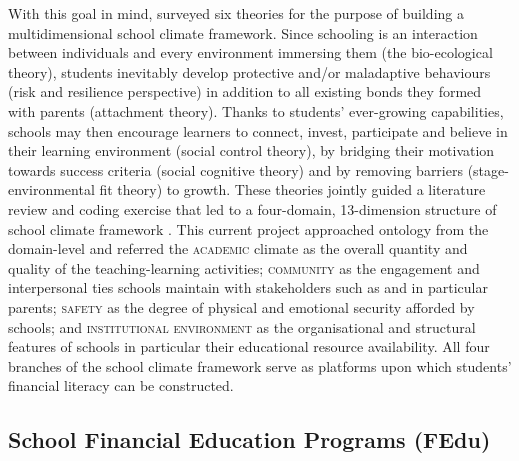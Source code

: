 \documentclass[a4paper,11pt,UKenglish,twoside,openright]{report}\usepackage[]{graphicx}\usepackage[]{color}
\begin{document}
With this goal in mind, \textcite{wang:2016} surveyed six theories for the purpose of building a multidimensional school climate framework. Since schooling is an interaction between individuals and every environment immersing them (the bio-ecological theory), students inevitably develop protective and/or maladaptive behaviours (risk and resilience perspective) in addition to all existing bonds they formed with parents (attachment theory). Thanks to students' ever-growing capabilities, schools may then encourage learners to connect, invest, participate and believe in their learning environment (social control theory), by bridging their motivation towards success criteria (social cognitive theory) and by removing barriers (stage-
environmental fit theory) to growth. These theories jointly guided a literature review and coding exercise that led to a four-domain, 13-dimension structure of school climate framework \parencite[see Figure 1,][p. 318]{wang:2016}. This current project approached  ontology from the domain-level and referred the \textsc{academic} climate as the overall quantity and quality of the teaching-learning activities; \textsc{community} as the engagement and interpersonal ties schools maintain with stakeholders such as and in particular parents; \textsc{safety} as the degree of physical and emotional security afforded by schools; and \textsc{institutional environment} as the organisational and structural features of schools in particular their educational resource availability. All four branches of the school climate framework serve as platforms upon which students' financial literacy can be constructed.

\subsection{School Financial Education Programs (FEdu)}
\end{document}

